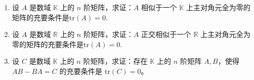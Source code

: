 \documentclass[../../main.tex]{subfiles}
\begin{document}
\begin{proposition}\label{proposition:迹零阵必相似于主对角全为零的矩阵}
\begin{enumerate}[(1)]
\item 设 $A$ 是数域 $\mathbb{K}$ 上的 $n$ 阶矩阵，求证：$A$ 相似于一个 $\mathbb{K}$ 上主对角元全为零的矩阵的充要条件是$\mathrm{tr}(A)=0$.

\item 设 $A$ 是数域 $\mathbb{R}$ 上的 $n$ 阶矩阵，求证：$A$ 正交相似于一个 $\mathbb{R}$ 上主对角元全为零的矩阵的充要条件是$\mathrm{tr}(A)=0$.

\item 设 $C$ 是数域 $\mathbb{K}$ 上的 $n$ 阶矩阵，求证：存在 $\mathbb{K}$ 上的 $n$ 阶矩阵 $A,B$，使得 $AB - BA = C$ 的充要条件是 $\mathrm{tr}(C)=0$。
\end{enumerate}
\end{proposition}
\end{document}

